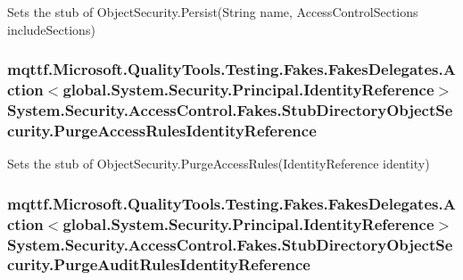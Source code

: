 Sets the stub of Object\-Security.\-Persist(\-String name, Access\-Control\-Sections include\-Sections)

\hypertarget{class_system_1_1_security_1_1_access_control_1_1_fakes_1_1_stub_directory_object_security_aa650e68136a900fd7870e67fb2aced68}{
\subsubsection[{Purge\-Access\-Rules\-Identity\-Reference}]{\setlength{\rightskip}{0pt plus 5cm}mqttf.\-Microsoft.\-Quality\-Tools.\-Testing.\-Fakes.\-Fakes\-Delegates.\-Action$<$global.\-System.\-Security.\-Principal.\-Identity\-Reference$>$ System.\-Security.\-Access\-Control.\-Fakes.\-Stub\-Directory\-Object\-Security.\-Purge\-Access\-Rules\-Identity\-Reference}}\label{class_system_1_1_security_1_1_access_control_1_1_fakes_1_1_stub_directory_object_security_aa650e68136a900fd7870e67fb2aced68}


Sets the stub of Object\-Security.\-Purge\-Access\-Rules(\-Identity\-Reference identity)

\hypertarget{class_system_1_1_security_1_1_access_control_1_1_fakes_1_1_stub_directory_object_security_aed9efdda7be679589e1d0de7a8d56eef}{
\subsubsection[{Purge\-Audit\-Rules\-Identity\-Reference}]{\setlength{\rightskip}{0pt plus 5cm}mqttf.\-Microsoft.\-Quality\-Tools.\-Testing.\-Fakes.\-Fakes\-Delegates.\-Action$<$global.\-System.\-Security.\-Principal.\-Identity\-Reference$>$ System.\-Security.\-Access\-Control.\-Fakes.\-Stub\-Directory\-Object\-Security.\-Purge\-Audit\-Rules\-Identity\-Reference}}\label{class_system_1_1_security_1_1_access_control_1_1_fakes_1_1_stub_directory_object_security_aed9efdda7be679589e1d0de7a8d56eef}


